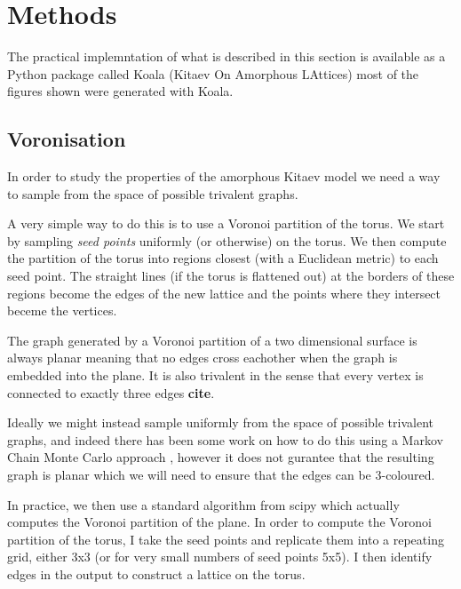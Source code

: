 \begin{Shaded}
\begin{Highlighting}[]
\OperatorTok{\%\%}
\end{Highlighting}
\end{Shaded}

\hypertarget{methods}{%
\section{Methods}\label{methods}}

The practical implemntation of what is described in this section is
available as a Python package called Koala (Kitaev On Amorphous
LAttices) \textcite{tomImperialCMTHKoalaFirst2022} most of the figures
shown were generated with Koala.

\hypertarget{voronisation}{%
\subsection{Voronisation}\label{voronisation}}

In order to study the properties of the amorphous Kitaev model we need a
way to sample from the space of possible trivalent graphs.

A very simple way to do this is to use a Voronoi partition of the torus.
We start by sampling \emph{seed points} uniformly (or otherwise) on the
torus. We then compute the partition of the torus into regions closest
(with a Euclidean metric) to each seed point. The straight lines (if the
torus is flattened out) at the borders of these regions become the edges
of the new lattice and the points where they intersect beceme the
vertices.

The graph generated by a Voronoi partition of a two dimensional surface
is always planar meaning that no edges cross eachother when the graph is
embedded into the plane. It is also trivalent in the sense that every
vertex is connected to exactly three edges \textbf{cite}.

Ideally we might instead sample uniformly from the space of possible
trivalent graphs, and indeed there has been some work on how to do this
using a Markov Chain Monte Carlo approach
\textcite{alyamiUniformSamplingDirected2016}, however it does not
gurantee that the resulting graph is planar which we will need to ensure
that the edges can be 3-coloured.

In practice, we then use a standard algorithm
\textcite{barberQuickhullAlgorithmConvex1996} from scipy
\textcite{virtanenSciPyFundamentalAlgorithms2020a} which actually
computes the Voronoi partition of the plane. In order to compute the
Voronoi partition of the torus, I take the seed points and replicate
them into a repeating grid, either 3x3 (or for very small numbers of
seed points 5x5). I then identify edges in the output to construct a
lattice on the torus.

